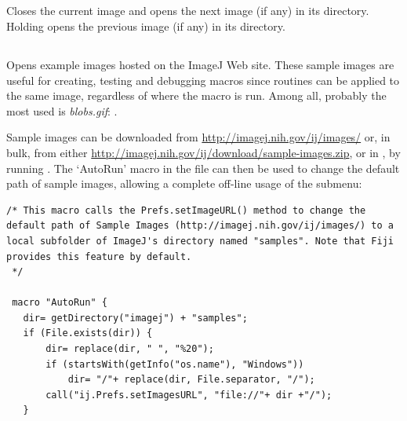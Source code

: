 \subsection{\protect{}\label{sub:OpenNext[O]}}

Closes the current image and opens the next image (if any) in its
directory. Holding  opens the previous image (if
any) in its directory.


\subsection{\protect{}\label{sub:OpenSamples}}

Opens example images hosted on the ImageJ Web
site. These sample images are useful for creating, testing and debugging
macros since routines can be applied to the same image, regardless
of where the macro is run. Among all, probably the most used is\emph{
blobs.gif}: .

Sample images can be downloaded from \href{http://imagej.nih.gov/ij/images/}{http://imagej.nih.gov/ij/images/}
or, in bulk, from either \url{http://imagej.nih.gov/ij/download/sample-images.zip},
or in , by running .
The `AutoRun' macro in the 
file can then be used to change the default path of sample images,
allowing a complete off-line usage of the 
submenu:

\begin{lstlisting}[caption={\index{Fiji}Setting \textsf{File\lyxarrow{}Open
Samples\lyxarrow{}} for Offline Usage},label={lis:Offline-Samples},showstringspaces=false,tabsize=4]
/* This macro calls the Prefs.setImageURL() method to change the default path of Sample Images (http://imagej.nih.gov/ij/images/) to a local subfolder of ImageJ's directory named "samples". Note that Fiji provides this feature by default.
 */

 macro "AutoRun" {
   dir= getDirectory("imagej") + "samples";
   if (File.exists(dir)) {
       dir= replace(dir, " ", "%20");
       if (startsWith(getInfo("os.name"), "Windows"))
           dir= "/"+ replace(dir, File.separator, "/");
       call("ij.Prefs.setImagesURL", "file://"+ dir +"/");
   } 
\end{lstlisting}



